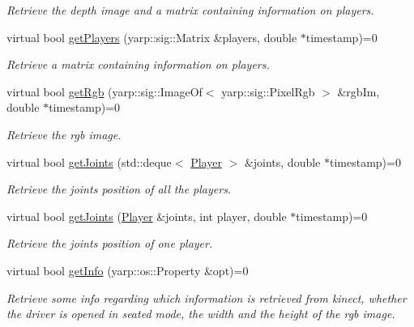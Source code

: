 \begin{DoxyCompactItemize}
\begin{DoxyCompactList}\small\item\em Retrieve the depth image and a matrix containing information on players. \end{DoxyCompactList}\item 
virtual bool \hyperlink{classkinectWrapper_1_1KinectWrapper_a71cf13b779d853330855cb079ecba774}{get\+Players} (yarp\+::sig\+::\+Matrix \&players, double $\ast$timestamp)=0
\begin{DoxyCompactList}\small\item\em Retrieve a matrix containing information on players. \end{DoxyCompactList}\item 
virtual bool \hyperlink{classkinectWrapper_1_1KinectWrapper_a617ad32f3fc2aa8b16961a71dd827482}{get\+Rgb} (yarp\+::sig\+::\+Image\+Of$<$ yarp\+::sig\+::\+Pixel\+Rgb $>$ \&rgb\+Im, double $\ast$timestamp)=0
\begin{DoxyCompactList}\small\item\em Retrieve the rgb image. \end{DoxyCompactList}\item 
virtual bool \hyperlink{classkinectWrapper_1_1KinectWrapper_aeaacd61922891a8375f9a35768e37580}{get\+Joints} (std\+::deque$<$ \hyperlink{structkinectWrapper_1_1Player}{Player} $>$ \&joints, double $\ast$timestamp)=0
\begin{DoxyCompactList}\small\item\em Retrieve the joints position of all the players. \end{DoxyCompactList}\item 
virtual bool \hyperlink{classkinectWrapper_1_1KinectWrapper_ab345e17fe0dc0d042c7fdf7f17dcb963}{get\+Joints} (\hyperlink{structkinectWrapper_1_1Player}{Player} \&joints, int player, double $\ast$timestamp)=0
\begin{DoxyCompactList}\small\item\em Retrieve the joints position of one player. \end{DoxyCompactList}\item 
virtual bool \hyperlink{classkinectWrapper_1_1KinectWrapper_a1cb049a6f2d2138edf35da4bc77e0530}{get\+Info} (yarp\+::os\+::\+Property \&opt)=0
\begin{DoxyCompactList}\small\item\em Retrieve some info regarding which information is retrieved from kinect, whether the driver is opened in seated mode, the width and the height of the rgb image. \end{DoxyCompactList}\item 

\end{DoxyCompactItemize}
